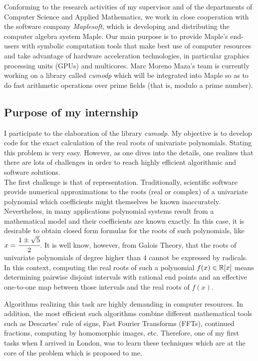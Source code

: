 Conforming to the research activities of my supervisor and of the departments of Computer Science and Applied Mathematics, we work in close cooperation with the software company {\it Maplesoft}, which is developing and distributing the computer algebra system {\sc Maple}. Our main purpose is to provide {\sc Maple}'s end-users with symbolic computation tools 
that make best use of computer resources and take advantage of hardware acceleration technologies, in particular graphics processing units (GPUs) and multicores. Marc Moreno Maza's team is currently working on a library called \textit{cumodp} which will be integrated into {\sc Maple} so as to do fast arithmetic operations over prime fields (that is, modulo a prime number).

\subsection{Purpose of my internship}

I participate to the elaboration of the library \textit{cumodp}. My objective is to develop code for the exact calculation of the real roots of  univariate polynomials. Stating this problem is very easy. However, as one dives into the details, one realizes that there are lots of challenges in order to reach highly efficient algorithmic and software solutions.\\

The first challenge is that of representation. Traditionally, scientific software provide numerical approximations to the roots (real or complex) 
of a univariate polynomial which coefficients might themselves 
be known inaccurately. Nevertheless, in many applications 
polynomial systems 
result from a mathematical model and their coefficients are known exactly.  In this case, it is desirable to obtain closed form formulas for the roots of such polynomials, like $x = \cfrac{1 \pm \sqrt{5}}{2}$.
It is well know, however, from Galois Theory, that the roots of
univariate polynomials of degree higher than $4$ cannot
be expressed by radicals.\\

In this context,
computing the real roots of such a polynomial $f(x) \in {{\mathbb R}}[x]$ means
determining pairwise disjoint intervals with rational end points
and an effective one-to-one map between those intervals and 
the  real roots of $f(x)$.

Algorithms realizing this task are highly demanding in computer
resources. In addition, the most efficient such algorithms
combine different mathematical tools such as Descartes' rule
of signs,  Fast Fourier Transforms (FFTs),
continued fractions, computing by homomorphic images, etc.
Therefore, one of my first tasks  when I arrived in London, 
was to learn these techniques which are at the core
of the problem which is proposed to me.

